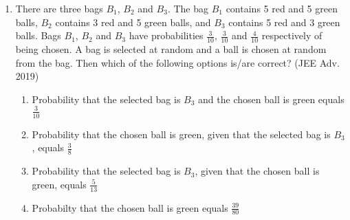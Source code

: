 \documentclass[journal,,12pt,twocolumn]{IEEEtran}
\theoremstyle{remark}
\begin{document}
\begin{enumerate}
\begin{enumerate}
        \end{enumerate}
    \item There are three bags $B_1$, $B_2$ and $B_3$. The bag $B_1$ contains 5 red and 5 green balls, $B_2$ contains 3 red and 5 green balls, and $B_3$ contains 5 red and 3 green balls. Bags $B_1$, $B_2$ and $B_3$ have probabilities $\frac{3}{10}$, $\frac{3}{10}$ and $\frac{4}{10}$ respectively of being chosen. A bag is selected at random and a ball is chosen at random from the bag. Then which of the following options is/are correct?
    \hfill{(JEE Adv. 2019)}
    \begin{enumerate}[label=\alph*)]
        \item Probability that the selected bag is $B_3$ and the chosen ball is green equals $\frac{3}{10}$
        \item Probability that the chosen ball is green, given that the selected bag is $B_3$, equals $\frac{3}{8}$
        \item Probability that the selected bag is $B_3$, given that the chosen ball is green, equals $\frac{5}{13}$
        \item Probabilty that the chosen ball is green equals $\frac{39}{80}$
    \end{enumerate}
        \end{enumerate}
\end{document}
